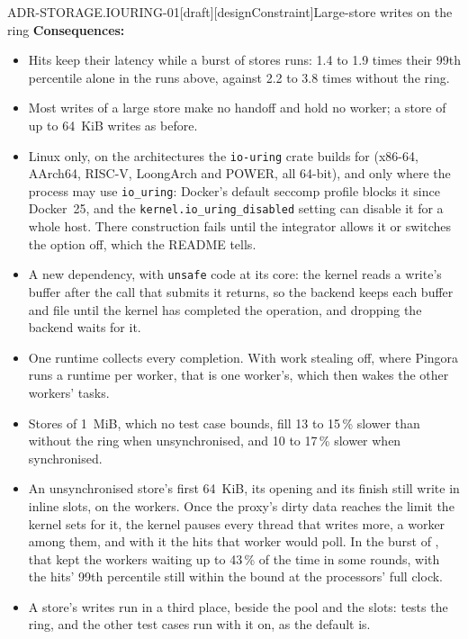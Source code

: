 \begin{requirement}{ADR-STORAGE.IOURING-01}[draft][designConstraint]{Large-store writes on the ring}
  \textbf{Consequences:}
  \begin{itemize}
    \item[+] Hits keep their latency while a burst of stores runs: 1.4 to
      1.9 times their 99th percentile alone in the runs above, against 2.2 to
      3.8 times without the ring.
    \item[+] Most writes of a large store make no handoff and hold no
      worker; a store of up to 64~KiB writes as before.
    \item[--] Linux only, on the architectures the \texttt{io-uring} crate
      builds for (x86-64, AArch64, RISC-V, LoongArch and POWER, all 64-bit),
      and only where the process may use \texttt{io\_uring}: Docker's
      default seccomp profile blocks it since Docker~25, and the
      \texttt{kernel.io\_uring\_disabled} setting can disable it for a
      whole host. There construction fails until the integrator allows it or
      switches the option off, which the README tells.
    \item[--] A new dependency, with \texttt{unsafe} code at its core: the
      kernel reads a write's buffer after the call that submits it returns,
      so the backend keeps each buffer and file until the kernel has
      completed the operation, and dropping the backend waits for it.
    \item[--] One runtime collects every completion. With work stealing
      off, where Pingora runs a runtime per worker, that is one worker's,
      which then wakes the other workers' tasks.
    \item[--] Stores of 1~MiB, which no test case bounds, fill 13 to 15\,\%
      slower than without the ring when unsynchronised, and 10 to 17\,\%
      slower when synchronised.
    \item[--] An unsynchronised store's first 64~KiB, its opening and its
      finish still write in inline slots, on the workers. Once the proxy's
      dirty data reaches the limit the kernel sets for it, the kernel
      pauses every thread that writes more, a worker among them, and with
      it the hits that worker would poll. In the burst of
      , that kept the workers waiting up
      to 43\,\% of the time in some rounds, with the hits' 99th percentile
      still within the bound at the processors' full clock.
    \item[--] A store's writes run in a third place, beside the pool and the
      slots:  tests the ring, and the other
      test cases run with it on, as the default is.
  \end{itemize}


\end{requirement}
